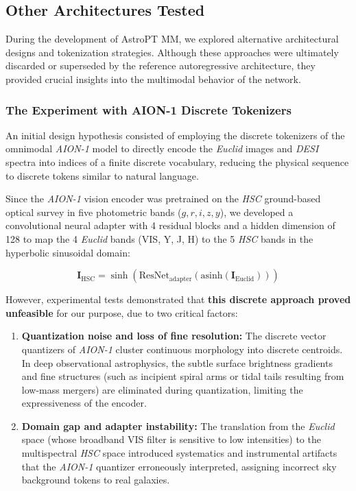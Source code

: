 \subsection{Other Architectures Tested} \label{sec:dev:exploratory}

During the development of AstroPT MM, we explored alternative architectural designs and tokenization strategies. Although these approaches were ultimately discarded or superseded by the reference autoregressive architecture, they provided crucial insights into the multimodal behavior of the network.

\subsubsection{The Experiment with AION-1 Discrete Tokenizers}

An initial design hypothesis consisted of employing the discrete tokenizers of the omnimodal \textit{AION-1} model \autocite{ar:aion-1} to directly encode the \textit{Euclid} images and \textit{\gls{DESI}} spectra into indices of a finite discrete vocabulary, reducing the physical sequence to discrete tokens similar to natural language.

Since the \textit{AION-1} vision encoder was pretrained on the \textit{\gls{HSC}} ground-based optical survey in five photometric bands ($g, r, i, z, y$), we developed a convolutional neural adapter with 4 residual blocks and a hidden dimension of 128 to map the 4 \textit{Euclid} bands (VIS, Y, J, H) to the 5 \textit{\gls{HSC}} bands in the hyperbolic sinusoidal domain:

\begin{equation}
\mathbf{I}_{\text{HSC}} = \sinh\left(\text{ResNet}_{\text{adapter}}\left(\text{asinh}\left(\mathbf{I}_{\text{Euclid}}\right)\right)\right)
\label{eq:hsc_adapter}
\end{equation}

However, experimental tests demonstrated that \textbf{this discrete approach proved unfeasible} for our purpose, due to two critical factors:

\begin{enumerate}
\item \textbf{Quantization noise and loss of fine resolution:} The discrete vector quantizers of \textit{AION-1} cluster continuous morphology into discrete centroids. In deep observational astrophysics, the subtle surface brightness gradients and fine structures (such as incipient spiral arms or tidal tails resulting from low-mass mergers) are eliminated during quantization, limiting the expressiveness of the encoder.
\item \textbf{Domain gap and adapter instability:} The translation from the \textit{Euclid} space (whose broadband VIS filter is sensitive to low intensities) to the multispectral \textit{\gls{HSC}} space introduced systematics and instrumental artifacts that the \textit{AION-1} quantizer erroneously interpreted, assigning incorrect sky background tokens to real galaxies.
\end{enumerate}

